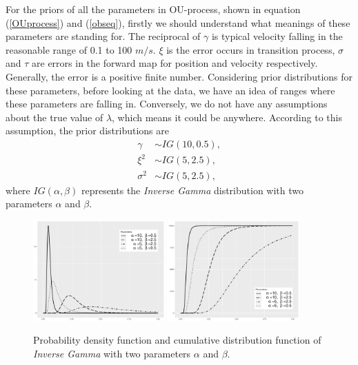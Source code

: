 For the priors of all the parameters in OU-process, shown in equation (\ref{OUprocess}) and (\ref{obseq}), firstly we should understand what meanings of these parameters are standing for. The reciprocal of $\gamma$ is typical velocity falling in the reasonable range of 0.1 to 100 $m/s$. $\xi$ is the error occurs in transition process, $\sigma$ and $\tau$ are errors in the forward map for position and velocity respectively. Generally, the error is a positive finite number. Considering prior distributions for these parameters, before looking at the data, we have an idea of ranges where these parameters are falling in. Conversely, we do not have any assumptions about the true value of $\lambda$, which means it could be anywhere. According to this assumption, the prior distributions are 
\begin{align*}
\gamma   &\sim IG(10,0.5),\\
\xi^2        &\sim IG(5,2.5),\\
\sigma^2 &\sim IG(5,2.5),
\end{align*}
where $IG(\alpha,\beta)$ represents the \textit{Inverse Gamma} distribution with two parameters $\alpha$ and $\beta$. 
\begin{figure}[h]
\centering
\includegraphics[width=0.45\textwidth]{Chapters/05MCMCOU/plots/ggIGPDF.pdf}
\includegraphics[width=0.45\textwidth]{Chapters/05MCMCOU/plots/ggIGCDF.pdf}
\caption{Probability density function and cumulative distribution function of \textit{Inverse Gamma} with two parameters $\alpha$ and $\beta$. }
\label{IGPDFCDF}
\end{figure}


